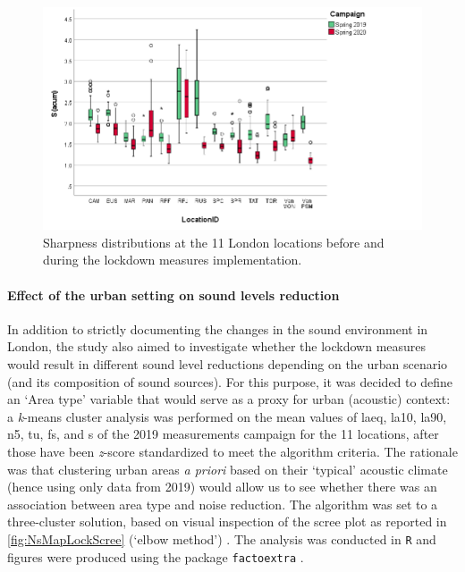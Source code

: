 \begin{figure}[h]
  \centering
  \includegraphics[width=\textwidth]{Figures/LockdownSharp.png}
  \caption{Sharpness distributions at the 11 London locations before and during the lockdown measures implementation. \label{fig:NsMapLockS}}

\end{figure}


\paragraph*{Effect of the urban setting on sound levels reduction}
In addition to strictly documenting the changes in the sound environment in London, the study also aimed to investigate whether the lockdown measures would result in different sound level reductions depending on the urban scenario (and its composition of sound sources). For this purpose, it was decided to define an `Area type' variable that would serve as a proxy for urban (acoustic) context: a \emph{k}-means cluster analysis was performed on the mean values of \gls{laeq}, \gls{la10}, \gls{la90}, \gls{n5}, \gls{tu}, \gls{fs}, and \gls{s} of the 2019 measurements campaign for the 11 locations, after those have been \emph{z}-score standardized to meet the algorithm criteria. The rationale was that clustering urban areas \emph{a priori} based on their `typical' acoustic climate (hence using only data from 2019) would allow us to see whether there was an association between area type and noise reduction. The algorithm was set to a three-cluster solution, based on visual inspection of the scree plot as reported in \cref{fig:NsMapLockScree} (`elbow method') \citep{KetchenJr.1996application}. The analysis was conducted in \texttt{R} \citep{RCT2018R} and figures were produced using the package \texttt{factoextra} \citep{Kassambara2020factoextra}.

